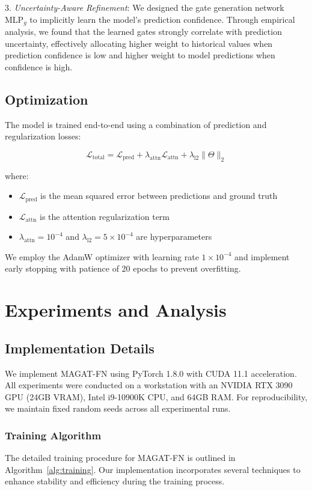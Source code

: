 \documentclass[lettersize, journal]{IEEEtran}
\begin{document}
3. \textit{Uncertainty-Aware Refinement}: We designed the gate generation network $\text{MLP}_g$ to implicitly learn the model's prediction confidence. Through empirical analysis, we found that the learned gates strongly correlate with prediction uncertainty, effectively allocating higher weight to historical values when prediction confidence is low and higher weight to model predictions when confidence is high.

\subsection{Optimization}
The model is trained end-to-end using a combination of prediction and regularization losses:

\begin{equation}
\mathcal{L}_{\text{total}} = \mathcal{L}_{\text{pred}} + \lambda_{\text{attn}}\mathcal{L}_{\text{attn}} + \lambda_{\text{l2}}\|\Theta\|_2
\end{equation}

where:
\begin{itemize}
    \item $\mathcal{L}_{\text{pred}}$ is the mean squared error between predictions and ground truth
    \item $\mathcal{L}_{\text{attn}}$ is the attention regularization term
    \item $\lambda_{\text{attn}} = 10^{-4}$ and $\lambda_{\text{l2}} = 5 \times 10^{-4}$ are hyperparameters
\end{itemize}

We employ the AdamW optimizer with learning rate $1 \times 10^{-4}$ and implement early stopping with patience of 20 epochs to prevent overfitting.

\section{Experiments and Analysis}

\subsection{Implementation Details}
We implement MAGAT-FN using PyTorch 1.8.0 with CUDA 11.1 acceleration. All experiments were conducted on a workstation with an NVIDIA RTX 3090 GPU (24GB VRAM), Intel i9-10900K CPU, and 64GB RAM. For reproducibility, we maintain fixed random seeds across all experimental runs.

\subsubsection{Training Algorithm}
The detailed training procedure for MAGAT-FN is outlined in Algorithm~\ref{alg:training}. Our implementation incorporates several techniques to enhance stability and efficiency during the training process.
\end{document}
